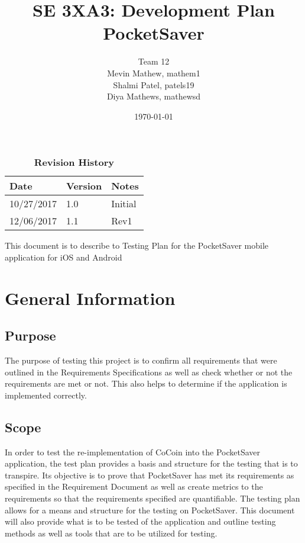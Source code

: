 \documentclass[12pt, titlepage]{article}
\title{SE 3XA3: Development Plan\\PocketSaver}
\author{Team 12
		\\ Mevin Mathew, mathem1
		\\ Shalmi Patel, patels19
		\\ Diya Mathews, mathewsd
}
\date{\today}
\begin{document}
\maketitle

\tableofcontents
\listoftables
\listoffigures

\begin{table}[bp]
\caption{\bf Revision History}
\begin{tabularx}{\textwidth}{p{3cm}p{2cm}X}
\toprule {\bf Date} & {\bf Version} & {\bf Notes}\\
\midrule
10/27/2017 & 1.0 & Initial\\
12/06/2017 & 1.1 & Rev1\\
\bottomrule
\end{tabularx}
\end{table}

\newpage


This document is to describe to Testing Plan for the PocketSaver mobile application for iOS and Android

\section{General Information}

\subsection{Purpose}
The purpose of testing this project is to confirm all requirements that were outlined in the Requirements Specifications as well as check whether or not the requirements are met or not. This also helps to determine if the application is implemented correctly.

\subsection{Scope}
In order to test the re-implementation of CoCoin into the PocketSaver application, the test plan provides a basis and structure for the testing that is to transpire. Its objective is to prove that PocketSaver has met its requirements as specified in the Requirement Document as well as create metrics to the requirements so that the requirements specified are quantifiable. The testing plan allows for a means and structure for the testing on PocketSaver. This document will also provide what is to be tested of the application and outline testing methods as well as tools that are to be utilized for testing.
\end{document}
